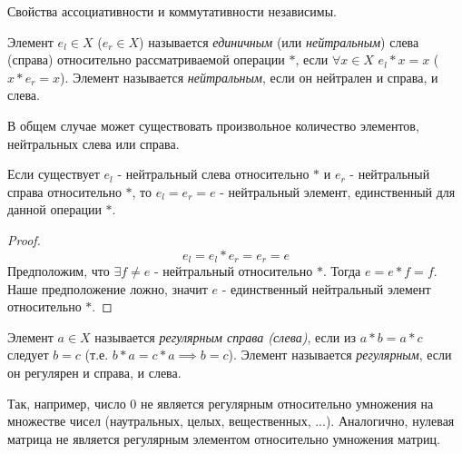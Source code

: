 \begin{remark}
    Свойства ассоциативности и коммутативности независимы.
\end{remark}

\begin{definition}
    Элемент $e_l \in X$ ($e_r \in X$) называется \textit{единичным} (или \textit{нейтральным}) слева (справа) относительно рассматриваемой операции $*$, если $\forall x\in X$ $e_l*x=x$ ($x*e_r=x$). Элемент называется \textit{нейтральным}, если он нейтрален и справа, и слева.
\end{definition}

\begin{remark}
    В общем случае может существовать произвольное количество элементов, нейтральных слева или справа.
\end{remark}

\begin{theorem}
    Если существует $e_l$ - нейтральный слева относительно $*$ и $e_r$ - нейтральный справа относительно $*$, то $e_l = e_r =e$ - нейтральный элемент, единственный для данной операции $*$.
\end{theorem}
\begin{proof}
        $$e_l = e_l * e_r = e_r = e$$
        Предположим, что $\exists f \ne e$ - нейтральный относительно $*$. Тогда $e = e * f = f$. Наше предположение ложно, значит $e$ - единственный нейтральный элемент относительно $*$.
\end{proof}

\begin{definition}
    Элемент $a\in X$ называется \textit{регулярным справа (слева)}, если из $a*b=a*c$ следует $b=c$ (т.е. $b*a=c*a \implies b=c$). Элемент называется \textit{регулярным}, если он регулярен и справа, и слева.
\end{definition}

Так, например, число $0$ не является регулярным относительно умножения на множестве чисел (наутральных, целых, вещественных, ...). Аналогично, нулевая матрица не является регулярным элементом относительно умножения матриц.


